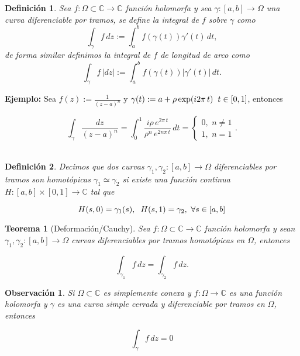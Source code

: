 \documentclass[letterpaper]{report}
\newtheorem{teorema}{Teorema}[chapter]
\newtheorem{obs}{Observaci\'on}
\newtheorem{def.}{Definici\'on}[chapter]
\newcommand{\co}{\ensuremath{\mathbb C }}
\begin{document}
\begin{def.}
Sea $f:\Omega\subset\co\rightarrow\co$ función holomorfa y sea $\gamma:[a,b]\rightarrow\Omega$ una curva diferenciable por tramos, se define la integral de $f$ sobre $\gamma$ como
\begin{equation}
\int_{\gamma}f\,dz:=\int_a^b f(\gamma(t))\gamma'(t)\,dt,
\end{equation}
de forma similar definimos la integral de $f$ de longitud de arco como 
\begin{equation}
\int_{\gamma}f\,\vert dz\vert:=\int_a^b f(\gamma(t))\vert\gamma'(t)\vert\,dt.
\end{equation}
\end{def.}

\noindent\textbf{Ejemplo:} Sea $f(z):=\frac{1}{(z-a)^n}$ y $\gamma(t):=a+\rho \exp(i2\pi\,t)\hspace{0.2cm}t\in[0,1]$, entonces

$$\int_{\gamma}\frac{dz}{(z-a)^n}=
\int_0^1\frac{i\rho\,e^{2\pi\,t}}{\rho^n\,e^{2n\pi\,t}}\,dt=
\begin{cases}
0,\,\,n\neq 1\\
1,\,\,n=1
\end{cases}
.$$
\\

\begin{def.}
Decimos que dos curvas $\gamma_1,\gamma_2:[a,b]\rightarrow\Omega$ diferenciables por tramos son homotópicas $\gamma_1\simeq\gamma_2$ si existe una función continua $H:[a,b]\times[0,1]\rightarrow\co$ tal que

$$H(s,0)=\gamma_1(s),\hspace{0.2cm}H(s,1)=\gamma_2,\,\,\forall s\in[a,b]$$ 
\end{def.}

\begin{teorema}[Deformación/Cauchy]
Sea $f:\Omega\subset\co\rightarrow\co$ función holomorfa y sean $\gamma_1,\gamma_2:[a,b]\rightarrow\Omega$ curvas diferenciables por tramos homotópicas en $\Omega$, entonces

$$\int_{\gamma_1}f\,dz=\int_{\gamma_2}f\,dz.$$
\end{teorema}

\begin{obs}
Si $\Omega\subset\co$ es simplemente conexa y $f:\Omega\rightarrow\co$ es una función holomorfa y $\gamma$ es una curva simple cerrada y diferenciable por tramos en $\Omega$, entonces

$$\int_{\gamma}f\,dz=0$$
\end{obs}
\end{document}

